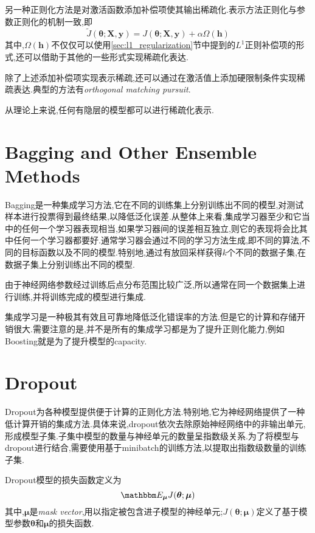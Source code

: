另一种正则化方法是对激活函数添加补偿项使其输出稀疏化.表示方法正则化与参数正则化的机制一致,即
\begin{equation}
\tilde J({\bm\theta};\bm{X,y})=J({\bm\theta};\bm{X,y})+\alpha\Omega(\bm h)
\end{equation}
其中,$\Omega(\bm h)$不仅仅可以使用\ref{sec:l1_regularization}节中提到的$L^1$正则补偿项的形式,还可以借助于其他的一些形式实现稀疏化表达.

除了上述添加补偿项实现表示稀疏,还可以通过在激活值上添加硬限制条件实现稀疏表达.典型的方法有\textit{orthogonal matching pursuit}.

从理论上来说,任何有隐层的模型都可以进行稀疏化表示.

\section{Bagging and Other Ensemble Methods}

Bagging是一种集成学习方法,它在不同的训练集上分别训练出不同的模型,对测试样本进行投票得到最终结果,以降低泛化误差.从整体上来看,集成学习器至少和它当中的任何一个学习器表现相当,如果学习器间的误差相互独立,则它的表现将会比其中任何一个学习器都要好.通常学习器会通过不同的学习方法生成,即不同的算法,不同的目标函数以及不同的模型.特别地,通过有放回采样获得$k$个不同的数据子集,在数据子集上分别训练出不同的模型.

由于神经网络参数经过训练后点分布范围比较广泛,所以通常在同一个数据集上进行训练,并将训练完成的模型进行集成.

集成学习是一种极其有效且可靠地降低泛化错误率的方法.但是它的计算和存储开销很大.需要注意的是,并不是所有的集成学习都是为了提升正则化能力,例如Boosting就是为了提升模型的capacity.

\section{Dropout}

Dropout为各种模型提供便于计算的正则化方法.特别地,它为神经网络提供了一种低计算开销的集成方法.具体来说,dropout依次去除原始神经网络中的非输出单元,形成模型子集.子集中模型的数量与神经单元的数量呈指数级关系.为了将模型与dropout进行结合,需要使用基于minibatch的训练方法,以提取出指数级数量的训练子集.

Dropout模型的损失函数定义为
\begin{equation}
\mathbbm E_{\bm\mu}J({\bm\theta};\bm\mu)
\end{equation}
其中,$\bm\mu$是\textit{mask vector},用以指定被包含进子模型的神经单元;$J({\bm\theta};\bm\mu)$定义了基于模型参数${\bm\theta}$和$\bm\mu$的损失函数.

